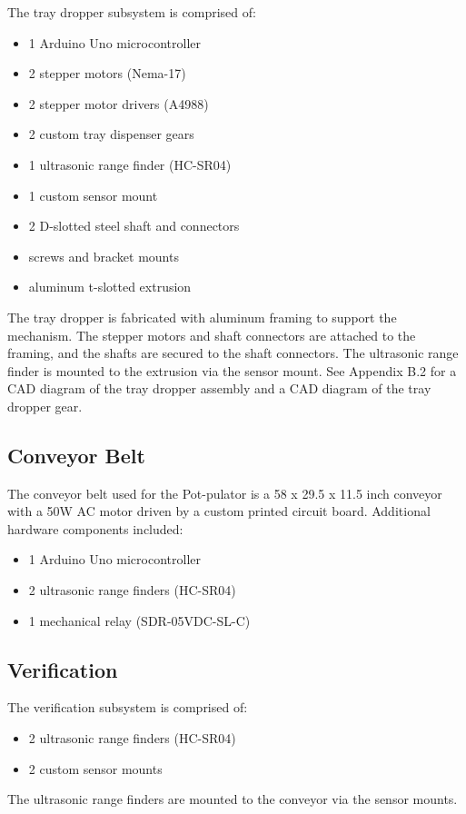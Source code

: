 \documentclass[12pt, titlepage]{article}
\begin{document}
The tray dropper subsystem is comprised of:
\begin{itemize}
  \item 1 Arduino Uno microcontroller
  \item 2 stepper motors (Nema-17)
  \item 2 stepper motor drivers (A4988)
  \item 2 custom tray dispenser gears
  \item 1 ultrasonic range finder (HC-SR04)
  \item 1 custom sensor mount
  \item 2 D-slotted steel shaft and connectors
  \item screws and bracket mounts
  \item aluminum t-slotted extrusion
\end{itemize}
The tray dropper is fabricated with aluminum framing to support the mechanism. The 
stepper motors and shaft connectors are attached to the framing, and the shafts 
are secured to the shaft connectors. The ultrasonic range finder is mounted to the 
extrusion via the sensor mount. See Appendix B.2 for a CAD diagram of the tray dropper assembly 
and a CAD diagram of the tray dropper gear.

\subsection{Conveyor Belt}

The conveyor belt used for the Pot-pulator is a 58 x 29.5 x 11.5 inch conveyor with a 50W AC motor driven by a custom printed
circuit board. Additional hardware components included:
\begin{itemize}
  \item 1 Arduino Uno microcontroller
  \item 2 ultrasonic range finders (HC-SR04)
  \item 1 mechanical relay (SDR-05VDC-SL-C)
\end{itemize}

\subsection{Verification}

The verification subsystem is comprised of:
\begin{itemize}
  \item 2 ultrasonic range finders (HC-SR04)
  \item 2 custom sensor mounts
\end{itemize}
The ultrasonic range finders are mounted to the conveyor via the sensor mounts.
\end{document}
